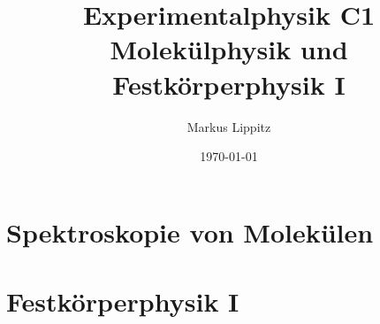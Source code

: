 \documentclass[notoc,nofonts,a4paper,twoside,nobib]{tufte-book}
\newcommand{\kapitelname}{Kapitel\ }
\begin{document}
  \tikzexternaldisable


\title{Experimentalphysik C1 \\ Molekülphysik und Festkörperphysik I}

\author{Markus Lippitz}
\date{\today}


\maketitle


%
\tableofcontents

%









\part{Spektroskopie von Molekülen}







\part{Festkörperphysik I}
%







%
%
%
%
%
%


\renewcommand{\kapitelname}{Anhang\ }


\appendix
\appendixpage




%

\printbibliography
\end{document}
